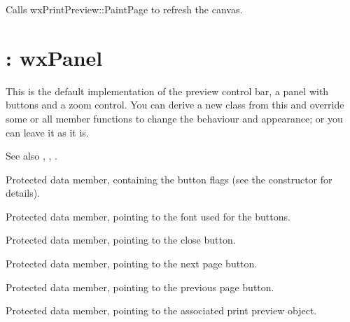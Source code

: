 
Calls wxPrintPreview::PaintPage to refresh the canvas.

\section{: wxPanel}\label{wxpreviewcontrolbar}

This is the default implementation of the preview control bar, a panel
with buttons and a zoom control. You can derive a new class from this and
override some or all member functions to change the behaviour and appearance;
or you can leave it as it is.

See also , ,
.



Protected data member, containing the button flags (see the constructor for details).



Protected data member, pointing to the font used for the buttons.



Protected data member, pointing to the close button.



Protected data member, pointing to the next page button.



Protected data member, pointing to the previous page button.



Protected data member, pointing to the associated print preview object.


